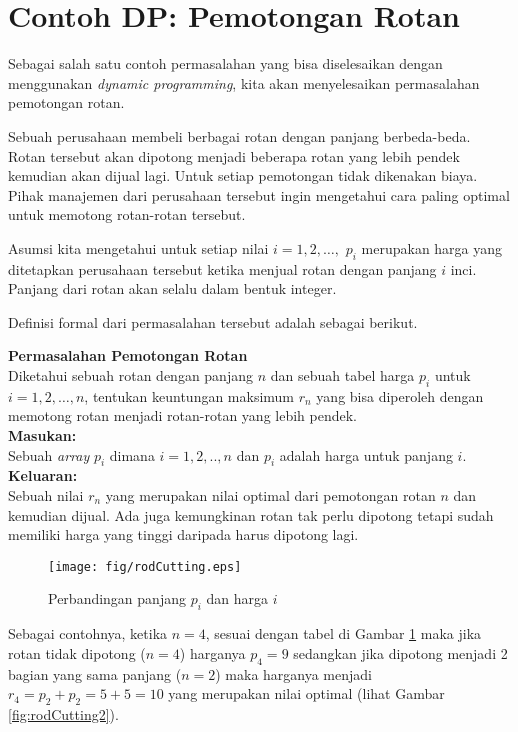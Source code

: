 \section{Contoh DP: Pemotongan Rotan}
Sebagai salah satu contoh permasalahan yang bisa diselesaikan dengan menggunakan \textit{dynamic programming}, kita akan menyelesaikan permasalahan pemotongan rotan. 

Sebuah perusahaan membeli berbagai rotan dengan panjang berbeda-beda. Rotan tersebut akan dipotong menjadi beberapa rotan yang lebih pendek kemudian akan dijual lagi. Untuk setiap pemotongan tidak dikenakan biaya. Pihak manajemen dari perusahaan tersebut ingin mengetahui cara paling optimal untuk memotong rotan-rotan tersebut.

Asumsi kita mengetahui untuk setiap nilai $i=1,2,\ldots,$ $p_i$ merupakan harga yang ditetapkan perusahaan tersebut ketika menjual rotan dengan panjang $i$ inci. Panjang dari rotan akan selalu dalam bentuk integer. 

Definisi formal dari permasalahan tersebut adalah sebagai berikut.

\begin{contoh}
\textbf{Permasalahan Pemotongan Rotan}\\
Diketahui sebuah rotan dengan panjang $n$ dan sebuah tabel harga $p_i$ untuk $i=1,2,\ldots,n$, tentukan keuntungan maksimum $r_n$ yang bisa diperoleh dengan memotong rotan menjadi rotan-rotan yang lebih pendek. \\
\textbf{Masukan:}\\
Sebuah \textit{array} $p_i$ dimana $i=1,2,..,n$ dan $p_i$ adalah harga untuk panjang $i$.\\
\textbf{Keluaran:}\\
Sebuah nilai $r_n$ yang merupakan nilai optimal dari pemotongan rotan $n$ dan kemudian dijual. Ada juga kemungkinan rotan tak perlu dipotong tetapi sudah memiliki harga yang tinggi daripada harus dipotong lagi.\\
\end{contoh}

\begin{figure}
\centering
\texttt{[image: fig/rodCutting.eps]}%
\caption{Perbandingan panjang $p_i$ dan harga $i$}%
\label{fig:rodCutting}%
\end{figure}


Sebagai contohnya, ketika $n=4$, sesuai dengan tabel di Gambar \ref{fig:rodCutting} maka jika rotan tidak dipotong ($n=4$) harganya $p_4 = 9$ sedangkan jika dipotong menjadi 2 bagian yang sama panjang ($n=2$) maka harganya menjadi $r_4=p_2+p_2=5+5=10$ yang merupakan nilai optimal (lihat Gambar \ref{fig:rodCutting2}).   

